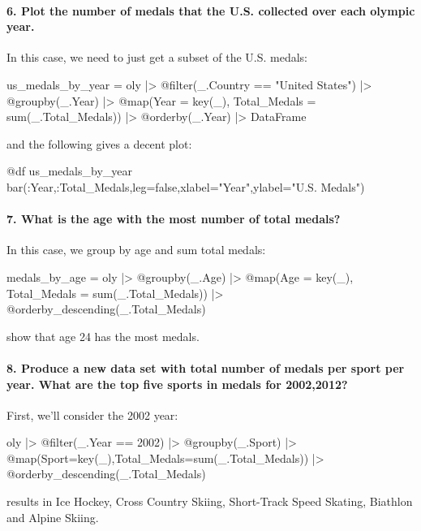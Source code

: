 \paragraph{6. Plot the number of medals that the U.S. collected over each olympic year.}

In this case, we need to just get a subset of the U.S. medals:
%
\begin{jlblock}[data]
us_medals_by_year = oly |>
  @filter(_.Country == "United States") |>
  @groupby(_.Year) |>
  @map({Year = key(_), Total_Medals = sum(_.Total_Medals)})  |>
  @orderby(_.Year) |>
  DataFrame
\end{jlblock}

and the following gives a decent plot:

\begin{jlblock}[data]
@df us_medals_by_year bar(:Year,:Total_Medals,leg=false,xlabel="Year",ylabel="U.S. Medals")
\end{jlblock}

\begin{center}
\pgfplotsset{scale=0.8}
\end{center}


\paragraph{7. What is the age with the most number of total medals?}

In this case, we group by age and sum total medals:
%
\begin{jlblock}[data]
medals_by_age = oly |>
  @groupby(_.Age) |>
  @map({Age = key(_), Total_Medals = sum(_.Total_Medals)}) |>
  @orderby_descending(_.Total_Medals)
\end{jlblock}
%
show that age 24 has the most medals.

\paragraph{8. Produce a new data set with total number of medals per sport per year. What are the top five sports in medals for 2002,2012?}

First, we'll consider the 2002 year:
%
\begin{jlblock}[data]
oly |>
  @filter(_.Year == 2002) |>
  @groupby(_.Sport) |>
  @map({Sport=key(_),Total_Medals=sum(_.Total_Medals)}) |>
  @orderby_descending(_.Total_Medals)
\end{jlblock}
%
results in Ice Hockey, Cross Country Skiing, Short-Track Speed Skating,
Biathlon and Alpine Skiing.

